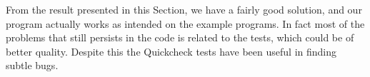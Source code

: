 

From the result presented in this Section, we have a fairly good solution, and our program actually works as intended on the example programs.
In fact most of the problems that still persists in the code is related to the tests, which could be of better quality. Despite this the Quickcheck tests have been useful in finding subtle bugs.


